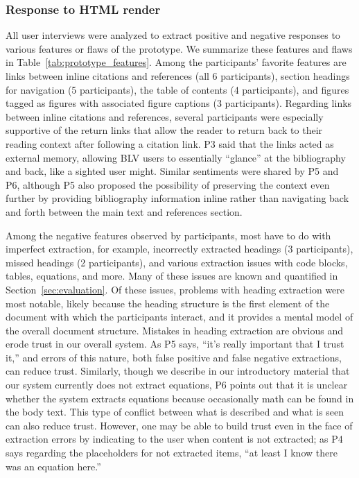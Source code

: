 \subsubsection*{Response to HTML render}

All user interviews were analyzed to extract positive and negative responses to various features or flaws of the prototype. We summarize these features and flaws in Table~\ref{tab:prototype_features}. Among the participants' favorite features are links between inline citations and references (all 6 participants), section headings for navigation (5 participants), the table of contents (4 participants), and figures tagged as figures with associated figure captions (3 participants). Regarding links between inline citations and references, several participants were especially supportive of the return links that allow the reader to return back to their reading context after following a citation link. P3 said that the links acted as external memory, allowing BLV users to essentially ``glance'' at the bibliography and back, like a sighted user might. Similar sentiments were shared by P5 and P6, although P5 also proposed the possibility of preserving the context even further by providing bibliography information inline rather than navigating back and forth between the main text and references section.

Among the negative features observed by participants, most have to do with imperfect extraction, for example, incorrectly extracted headings (3 participants), missed headings (2 participants), and various extraction issues with code blocks, tables, equations, and more. Many of these issues are known and quantified in Section~\ref{sec:evaluation}. Of these issues, problems with heading extraction were most notable, likely because the heading structure is the first element of the document with which the participants interact, and it provides a mental model of the overall document structure. Mistakes in heading extraction are obvious and erode trust in our overall system. As P5 says, ``it's really important that I trust it,'' and errors of this nature, both false positive and false negative extractions, can reduce trust. Similarly, though we describe in our introductory material that our system currently does not extract equations, P6 points out that it is unclear whether the system extracts equations because occasionally math can be found in the body text. This type of conflict between what is described and what is seen can also reduce trust. However, one may be able to build trust even in the face of extraction errors by indicating to the user when content is not extracted; as P4 says regarding the placeholders for not extracted items, ``at least I know there was an equation here.''

